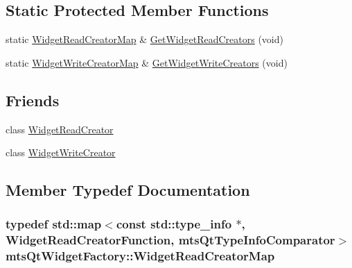\subsection*{Static Protected Member Functions}
\begin{DoxyCompactItemize}
\item 
static \hyperlink{classmts_qt_widget_factory_a22c882dba48529d554a71443765cb645}{Widget\+Read\+Creator\+Map} \& \hyperlink{classmts_qt_widget_factory_ae1c4cd68242b6b184762d4c2e233edfc}{Get\+Widget\+Read\+Creators} (void)
\item 
static \hyperlink{classmts_qt_widget_factory_aa2d044bd78383f0beb1973cbb076d4df}{Widget\+Write\+Creator\+Map} \& \hyperlink{classmts_qt_widget_factory_a7cd290938deff1f5471a9bb2640d22f1}{Get\+Widget\+Write\+Creators} (void)
\end{DoxyCompactItemize}
\subsection*{Friends}
\begin{DoxyCompactItemize}
\item 
class \hyperlink{classmts_qt_widget_factory_ad9d711027580a58bc57b4a3f6579be13}{Widget\+Read\+Creator}
\item 
class \hyperlink{classmts_qt_widget_factory_a19ec73574902b95864ee67c18b960512}{Widget\+Write\+Creator}
\end{DoxyCompactItemize}


\subsection{Member Typedef Documentation}
\hypertarget{classmts_qt_widget_factory_a22c882dba48529d554a71443765cb645}{}
\subsubsection[{Widget\+Read\+Creator\+Map}]{\setlength{\rightskip}{0pt plus 5cm}typedef std\+::map$<$const std\+::type\+\_\+info $\ast$, Widget\+Read\+Creator\+Function, {\bf mts\+Qt\+Type\+Info\+Comparator}$>$ {\bf mts\+Qt\+Widget\+Factory\+::\+Widget\+Read\+Creator\+Map}}\label{classmts_qt_widget_factory_a22c882dba48529d554a71443765cb645}
\hypertarget{classmts_qt_widget_factory_aa2d044bd78383f0beb1973cbb076d4df}{}

